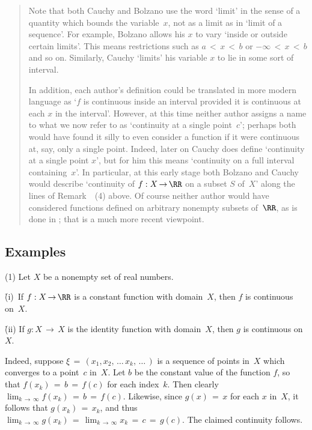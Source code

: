 \begin{quotation}
{\V

        Note that both Cauchy and Bolzano use the word `limit' in the sense of a quantity which bounds the variable~$x$,
    not as a limit as in `limit of a sequence'. For example, Bolzano allows his $x$ to vary `inside or outside certain limits'.
    This means restrictions such as $a\,<\,x\,<\,b$ or $-{\infty}\,<\,x\,<\,b$
 and so on. Similarly, Cauchy `limits' his variable $x$ to lie in some sort of interval.

        In addition, each author's definition could be translated in more modern language as
    `$f$ is continuous inside an interval provided it is continuous at each $x$ in the interval'.
    However, at this time neither author assigns a name to what we now refer to as `continuity at a single point~$c$';
    perhaps both would have found it silly to even consider a function if it were continuous at, say, only a single point.
    Indeed, later on Cauchy does define `continuity at a single point $x$', but for him this means `continuity on a full interval containing~$x$'.
    In particular, at this early stage both Bolzano and Cauchy would describe `continuity of $f:X \,{\rightarrow}\, {\RR}$ on a subset $S$ of~$X$'
    along the lines of Remark~~(4) above. Of course neither author would have considered functions defined on arbitrary nonempty subsets of~${\RR}$,
    as is done in {\ThisText}; that is a much more recent viewpoint.
}%
\end{quotation}

\VV

            \subsection{\small{\bf Examples}}
            \label{ExampD20.53}

\V

\hspace*{\parindent}(1) Let $X$ be a nonempty set of real numbers.

\VA

        \h (i)\, If $f:X \,{\rightarrow}\,{\RR}$ is a constant function with domain~$X$, then $f$ is continuous on~$X$.

        \h (ii) If $g:X \,{\rightarrow}\, X$ is the identity function with domain~$X$, then $g$ is continuous on~$X$.

\VA

\noindent Indeed, suppose ${\xi} \,=\, (x_{1}, x_{2},\,{\ldots}\,x_{k},\,{\ldots}\,)$
    is a sequence of points in~$X$ which converges to a point~$c$ in~$X$. Let $b$ be the constant value of the function $f$,
    so that $f(x_{k}) \,=\, b \,=\, f(c)$ for each index~$k$. Then clearly $\lim_{k \,{\rightarrow}\, {\infty}} f(x_{k}) \,=\, b \,=\, f(c)$.
    Likewise, since $g(x) \,=\, x$ for each $x$ in~$X$, it follows that $g(x_{k}) \,=\, x_{k}$,
    and thus $\lim_{k \,{\rightarrow}\, {\infty}} g(x_{k}) \,=\, \lim_{k \,{\rightarrow}\, {\infty}} x_{k} \,=\, c \,=\, g(c)$.
    The claimed continuity follows.

